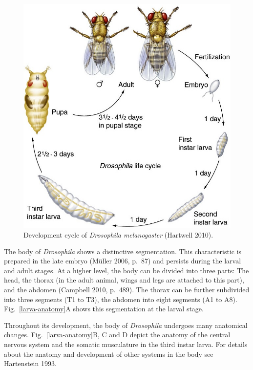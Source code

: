 \documentclass[12pt,a4paper,]{report}
\begin{document}
\begin{figure}
\centering
\includegraphics[width=0.600\hsize]{images/development-cycle.jpg}
\caption[Development cycle of \emph{Drosophila melanogaster}]{Development cycle of \emph{Drosophila melanogaster}
(Hartwell 2010).}\label{development-cycle}
\end{figure}

The body of \emph{Drosophila} shows a distinctive segmentation. This
characteristic is prepared in the late embryo (Müller 2006, p.~87) and
persists during the larval and adult stages. At a higher level, the body
can be divided into three parts: The head, the thorax (in the adult
animal, wings and legs are attached to this part), and the abdomen
(Campbell 2010, p.~489). The thorax can be further subdivided into three
segments (T1 to T3), the abdomen into eight segments (A1 to A8).
Fig.~\ref{larva-anatomy}A shows this segmentation at the larval stage.

Throughout its development, the body of \emph{Drosophila} undergoes many
anatomical changes. Fig.~\ref{larva-anatomy}B, C and D depict the
anatomy of the central nervous system and the somatic musculature in the
third instar larva. For details about the anatomy and development of
other systems in the body see Hartenstein 1993.
\end{document}
